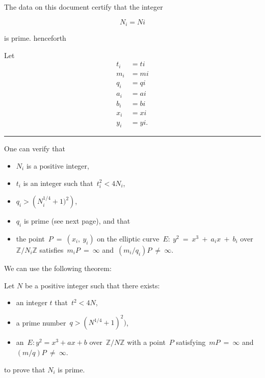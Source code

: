 \pagestyle{empty}
\phantom{a}
\vspace{2em}

\begin{center}
{\Huge {}}
\end{center}
\vspace{2em}

\noindent The data on this document certify that the integer

{\tiny
$$
N_{ {{ i }} } = {{ Ni }}
$$
}

\noindent is prime. {{ henceforth }}

\vspace{2em}

\noindent Let
{\tiny
\begin{align*}
t_{ {{ i }} } &= {{ ti }} \\
m_{ {{ i }} } &= {{ mi }} \\
q_{ {{ i }} } &= {{ qi }} \\
a_{ {{ i }} } &= {{ ai }} \\
b_{ {{ i }} } &= {{ bi }} \\
x_{ {{ i }} } &= {{ xi }} \\
y_{ {{ i }} } &= {{ yi }}.
\end{align*}
}

\vspace{0.5em}
\hrule
\vspace{0.5em}

\begin{multicols}{2}
\noindent One can verify that
\begin{itemize}
\item $N_{ {{ i }} }$ is a positive integer,
\item $t_{ {{ i }} }$ is an integer such that~$t_{ {{ i }} }^2 < 4N_{ {{ i }} }$,
\item $q_{ {{ i }} } > \left(N_{ {{ i }} }^{1/4} + 1)^2\right)$,
\item $q_{ {{ i }} }$ is prime (see next page), and that
\item the point~$P~=~(x_{ {{ i }} },~y_{ {{ i }} })$ on the elliptic curve~$E:~y^2~=~x^3~+~a_{ {{ i }} }x~+~b_{ {{ i }} }$ over~$\mathbb{Z}/{N_{ {{ i }} }}\mathbb{Z}$ satisfies~$m_{ {{ i }} }P~=~\infty$ and~$(m_{ {{ i }} }/q_{ {{ i }} })P~\neq~\infty$.
\end{itemize}
\columnbreak
\noindent We can use the following theorem:
\begin{theorem*}
Let $N$ be a positive integer such that there exists:
\begin{itemize}
\item an integer $t$ that~$t^2 < 4N$,
\item a prime number~$q > (N^{1/4} + 1)^2)$,
\item an~$E: y^2 = x^3 + ax + b$ over~$\mathbb{Z}/{N}\mathbb{Z}$ with a point~$P$ satisfying~$mP~=~\infty$ and~$(m/q)P~\neq~\infty$.
\end{itemize}
\end{theorem*}
\noindent to prove that $N_{ {{ i }} }$ is prime.
\end{multicols}

\newpage